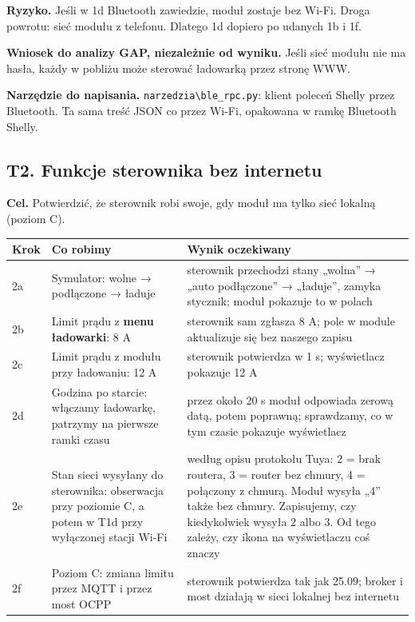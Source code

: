 \documentclass[11pt,a4paper]{article}
\begin{document}
\textbf{Ryzyko.} Jeśli w 1d Bluetooth zawiedzie, moduł zostaje bez Wi-Fi. Droga powrotu: sieć modułu z telefonu. Dlatego 1d dopiero po udanych 1b i 1f.


\textbf{Wniosek do analizy GAP, niezależnie od wyniku.} Jeśli sieć modułu nie ma hasła, każdy w pobliżu może sterować ładowarką przez stronę WWW.


\textbf{Narzędzie do napisania.} \texttt{narzedzia\textbackslash{}ble\_\allowbreak{}rpc.\allowbreak{}py}: klient poleceń Shelly przez Bluetooth. Ta sama treść JSON co przez Wi-Fi, opakowana w ramkę Bluetooth Shelly.


\subsection{T2. Funkcje sterownika bez internetu}

\textbf{Cel.} Potwierdzić, że sterownik robi swoje, gdy moduł ma tylko sieć lokalną (poziom C).


\begin{longtable}{>{\raggedright\arraybackslash}p{3.00cm}>{\raggedright\arraybackslash}p{5.62cm}>{\raggedright\arraybackslash}p{6.66cm}}
\toprule
\rowcolor{apteallight}\textbf{Krok} & \textbf{Co robimy} & \textbf{Wynik oczekiwany} \\
\midrule\endhead
\bottomrule\endfoot
2a & Symulator: wolne {\symbolfont→} podłączone {\symbolfont→} ładuje & sterownik przechodzi stany „wolna” {\symbolfont→} „auto podłączone” {\symbolfont→} „ładuje”, zamyka stycznik; moduł pokazuje to w polach \\
2b & Limit prądu z \textbf{menu ładowarki}: 8 A & sterownik sam zgłasza 8 A; pole w module aktualizuje się bez naszego zapisu \\
2c & Limit prądu z modułu przy ładowaniu: 12 A & sterownik potwierdza w 1 s; wyświetlacz pokazuje 12 A \\
2d & Godzina po starcie: włączamy ładowarkę, patrzymy na pierwsze ramki czasu & przez około 20 s moduł odpowiada zerową datą, potem poprawną; sprawdzamy, co w tym czasie pokazuje wyświetlacz \\
2e & Stan sieci wysyłany do sterownika: obserwacja przy poziomie C, a potem w T1d przy wyłączonej stacji Wi-Fi & według opisu protokołu Tuya: 2 = brak routera, 3 = router bez chmury, 4 = połączony z chmurą. Moduł wysyła „4” także bez chmury. Zapisujemy, czy kiedykolwiek wysyła 2 albo 3. Od tego zależy, czy ikona na wyświetlaczu coś znaczy \\
2f & Poziom C: zmiana limitu przez MQTT i przez most OCPP & sterownik potwierdza tak jak 25.09; broker i most działają w sieci lokalnej bez internetu \\
\end{longtable}
\end{document}

